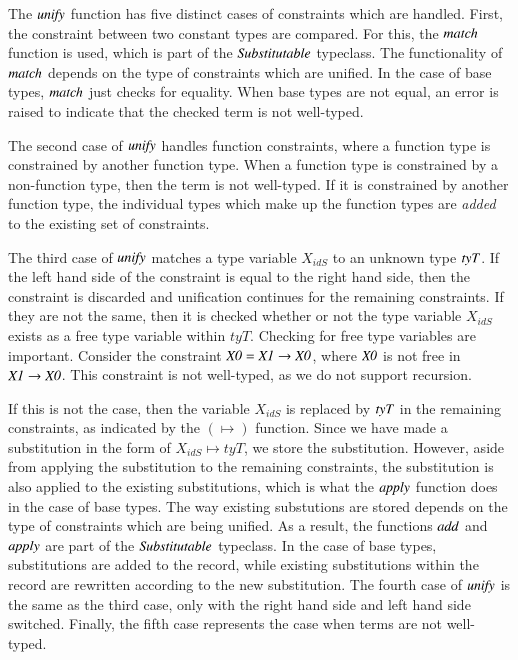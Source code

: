 The \ensuremath{\Varid{unify}} function has five distinct cases of constraints which are handled.
First, the constraint between two constant types are compared.
For this, the \ensuremath{\Varid{match}} function is used, which is part of the \ensuremath{\Conid{Substitutable}} typeclass. 
The functionality of \ensuremath{\Varid{match}} depends on the type of constraints which are unified.
In the case of base types, \ensuremath{\Varid{match}} just checks for equality.
When base types are not equal, an error is raised to indicate that the checked term is not well-typed.

The second case of \ensuremath{\Varid{unify}} handles function constraints, where a function type is constrained by another function type. 
When a function type is constrained by a non-function type, then the term is not well-typed.
If it is constrained by another function type, the individual types which make up the function types are \textit{added} to the existing set of constraints.

The third case of \ensuremath{\Varid{unify}} matches a type variable $X_{idS}$ to an unknown type \ensuremath{\Varid{tyT}}.
If the left hand side of the constraint is equal to the right hand side, then the constraint is discarded and unification continues for the remaining constraints.
If they are not the same, then it is checked whether or not the type variable $X_{idS}$ exists as a free type variable within $tyT$.
Checking for free type variables are important.  
Consider the constraint \ensuremath{\Conid{X0}\mathrel{=}\Conid{X1}\to \Conid{X0}}, where \ensuremath{\Conid{X0}} is not free in \ensuremath{\Conid{X1}\to \Conid{X0}}.
This constraint is not well-typed, as we do not support recursion.

If this is not the case, then the variable $X_{idS}$ is replaced by \ensuremath{\Varid{tyT}} in the remaining constraints, as indicated by the \ensuremath{(\mapsto)} function.
Since we have made a substitution in the form of $X_{idS} \mapsto tyT$, we store the substitution.
However, aside from applying the substitution to the remaining constraints, the substitution is also applied to the existing substitutions, which is what the \ensuremath{\Varid{apply}} function does in the case of base types.
The way existing substutions are stored depends on the type of constraints which are being unified.
As a result, the functions \ensuremath{\Varid{add}} and \ensuremath{\Varid{apply}} are part of the \ensuremath{\Conid{Substitutable}} typeclass.
In the case of base types, substitutions are added to the record, while existing substitutions within the record are rewritten according to the new substitution.
The fourth case of \ensuremath{\Varid{unify}} is the same as the third case, only with the right hand side and left hand side switched. 
Finally, the fifth case represents the case when terms are not well-typed.

